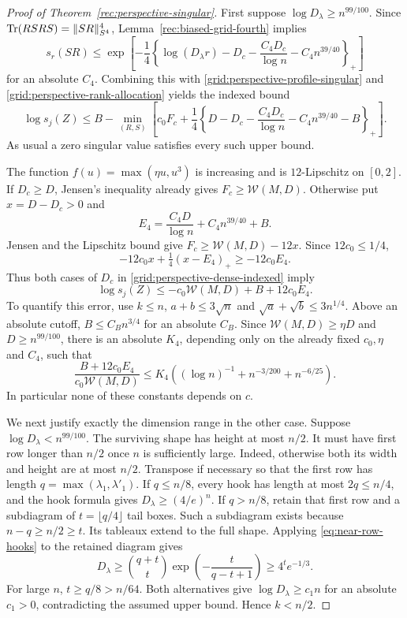 \begin{proof}[Proof of Theorem~\ref{rec:perspective-singular}]
First suppose $\log D_\lambda\ge n^{99/100}$.  Since
$\operatorname{Tr}(RSRS)=\|SR\|_{S^4}^4$, Lemma~\ref{rec:biased-grid-fourth}
implies
\[
 s_r(SR)\le
 \exp\left[-\frac14\left\{
 \log(D_\lambda r)-D_c-\frac{C_4D_c}{\log n}
                         -C_4n^{39/40}\right\}_+\right]
\]
for an absolute $C_4$.  Combining this with
\eqref{grid:perspective-profile-singular} and
\eqref{grid:perspective-rank-allocation} yields the indexed bound
\begin{equation}\label{grid:perspective-dense-indexed}
 \log s_j(Z)\le B-\min_{(R,S)}\left[
 c_0F_c+\frac14\left\{
 D-D_c-\frac{C_4D_c}{\log n}-C_4n^{39/40}-B
 \right\}_+\right].
\end{equation}
As usual a zero singular value satisfies every such upper bound.

The function $f(u)=\max(\eta u,u^3)$ is increasing and is
$12$-Lipschitz on $[0,2]$.  If $D_c\ge D$, Jensen's inequality
already gives $F_c\ge\mathcal W(M,D)$.  Otherwise put
$x=D-D_c>0$ and
\[
 E_4=\frac{C_4D}{\log n}+C_4n^{39/40}+B.
\]
Jensen and the Lipschitz bound give
$F_c\ge\mathcal W(M,D)-12x$.  Since $12c_0\le1/4$,
\[
 -12c_0x+\tfrac14(x-E_4)_+\ge-12c_0E_4.
\]
Thus both cases of $D_c$ in
\eqref{grid:perspective-dense-indexed} imply
\begin{equation}\label{grid:perspective-dense-error}
 \log s_j(Z)\le-c_0\mathcal W(M,D)+B+12c_0E_4.
\end{equation}
To quantify this error, use $k\le n$, $a+b\le3\sqrt n$ and
$\sqrt a+\sqrt b\le3n^{1/4}$.  Above an absolute cutoff,
$B\le C_B n^{3/4}$ for an absolute $C_B$.  Since
$\mathcal W(M,D)\ge\eta D$ and $D\ge n^{99/100}$, there is
an absolute $K_4$, depending only on the already fixed $c_0,\eta$
and $C_4$, such that
\begin{equation}\label{grid:perspective-dense-relative-error}
 \frac{B+12c_0E_4}{c_0\mathcal W(M,D)}
 \le K_4\left((\log n)^{-1}+n^{-3/200}+n^{-6/25}\right).
\end{equation}
In particular none of these constants depends on $c$.

We next justify exactly the dimension range in the other case.
Suppose $\log D_\lambda<n^{99/100}$.  The surviving shape has
height at most $n/2$.  It must have first row longer than $n/2$
once $n$ is sufficiently large.  Indeed, otherwise both its width
and height are at most $n/2$.  Transpose if necessary so that the
first row has length $q=\max(\lambda_1,\lambda'_1)$.  If
$q\le n/8$, every hook has length at most $2q\le n/4$, and the
hook formula gives $D_\lambda\ge(4/e)^n$.  If $q>n/8$, retain
that first row and a subdiagram of $t=\lfloor q/4\rfloor$ tail
boxes.  Such a subdiagram exists because $n-q\ge n/2\ge t$.
Its tableaux extend to the full shape.  Applying
\eqref{eq:near-row-hooks} to the retained diagram gives
\[
 D_\lambda\ge\binom{q+t}{t}
       \exp\left(-\frac{t}{q-t+1}\right)
 \ge4^t e^{-1/3}.
\]
For large $n$, $t\ge q/8>n/64$.  Both alternatives give
$\log D_\lambda\ge c_1n$ for an absolute $c_1>0$, contradicting
the assumed upper bound.  Hence $k<n/2$.


\end{proof}
